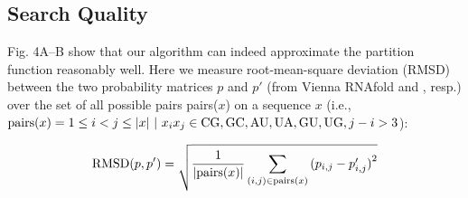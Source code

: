 \fi



\subsection{Search Quality}

Fig. 4A–B show that our \linearpartition algorithm can indeed approximate the partition function reasonably well. 
Here we measure root-mean-square deviation (RMSD) between the two probability matrices $p$ and $p'$ (from Vienna RNAfold and \linearpartition, resp.) 
over the set of all possible pairs pairs($x$) on a sequence $x$ (i.e., ${\rm{pairs}}(x)={1\leq{i}<j\leq{|x|} \ | \  x_{i}x_{j} \in {\rm CG, GC, AU, UA, GU, 
UG},j-i>3}$): 

\begin{equation}
{\rm{RMSD}}(p,p')=\sqrt{\frac{1}{|{\rm{pairs}}(x)|}\sum_{(i,j) \in {{\rm{pairs}}(x)}}{(p_{i,j}-p'_{i,j})}^2}
\end{equation}

